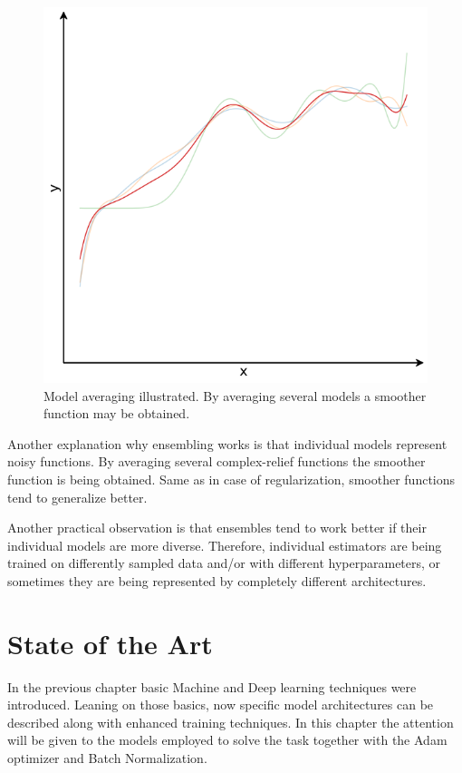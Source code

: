 \documentclass[thesis=B,english]{FITthesis}[2019/12/23]
\begin{document}
\begin{figure}[h]
	\centering
	\includegraphics[scale=0.35]{images/ensembling.png}
	\caption{Model averaging illustrated. By averaging several models a smoother function may be obtained.}
\end{figure}

Another explanation why ensembling works is that individual models represent noisy functions. By averaging several complex-relief functions the smoother function is being obtained. Same as in case of regularization, smoother functions tend to generalize better.

Another practical observation is that ensembles tend to work better if their individual models are more diverse. Therefore, individual estimators are being trained on differently sampled data and/or with different hyperparameters, or sometimes they are being represented by completely different architectures.

\chapter{State of the Art}

In the previous chapter basic Machine and Deep learning techniques were introduced. Leaning on those basics, now specific model architectures can be described along with enhanced training techniques. In this chapter the attention will be given to the models employed to solve the task together with the Adam optimizer and Batch Normalization.
\end{document}
